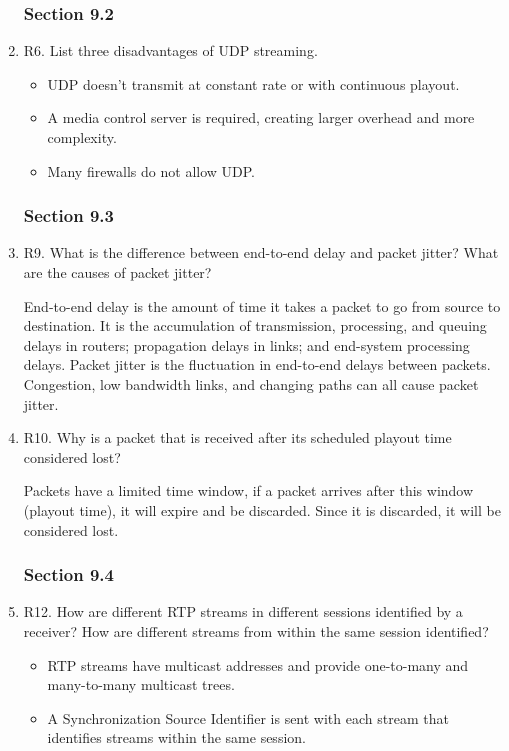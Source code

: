 \documentclass[12pt]{article}
\begin{document}
\begin{enumerate}
		\subsubsection*{Section 9.2}
	\item R6. List three disadvantages of UDP streaming.\par
		\color{CrispBlue}
		\begin{itemize}
			\item UDP doesn't transmit at constant rate or with continuous playout.
			\item A media control server is required, creating larger overhead and more complexity.
			\item Many firewalls do not allow UDP.
		\end{itemize}
		\color{black}
	\vspace{-2em}\subsubsection*{Section 9.3}
	\item R9. What is the difference between end-to-end delay and packet jitter? What are the causes of packet jitter?\par
		\color{CrispBlue}End-to-end delay is the amount of time it takes a packet to go from source to destination. It is the accumulation of transmission, processing, and queuing delays in routers; propagation delays in links; and end-system processing delays. Packet jitter is the fluctuation in end-to-end delays between packets. Congestion, low bandwidth links, and changing paths can all cause packet jitter.\color{black}
	\item R10. Why is a packet that is received after its scheduled playout time considered lost?\par
		\color{CrispBlue}Packets have a limited time window, if a packet arrives after this window (playout time), it will expire and be discarded. Since it is discarded, it will be considered lost.\color{black}
	\vspace{-1em}\subsubsection*{Section 9.4}
	\item R12. How are different RTP streams in different sessions identified by a receiver? How are different streams from within the same session identified?\par
	\color{CrispBlue}
		\begin{itemize}
			\item RTP streams have multicast addresses and provide one-to-many and many-to-many multicast trees.
			\item A Synchronization Source Identifier is sent with each stream that identifies streams within the same session.
		\end{itemize}
	\color{black}
\vspace{-1em}
\end{enumerate}\newpage
\end{document}
